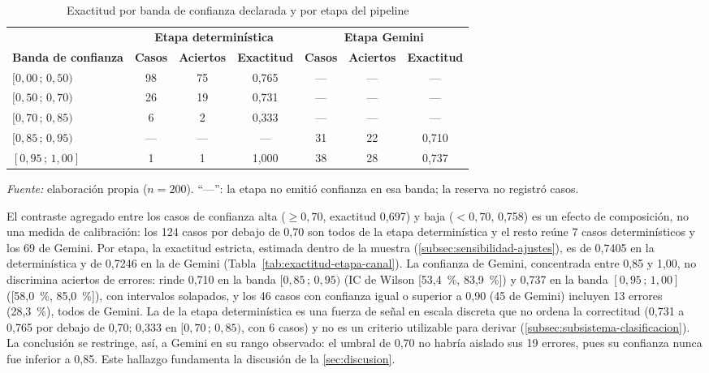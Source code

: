 \begin{table}[htbp]
\centering
\caption{Exactitud por banda de confianza declarada y por etapa del pipeline}
\label{tab:bandas}
\footnotesize
\setlength{\tabcolsep}{4pt}
\begin{tabular}{@{}l c c c c c c@{}}
\toprule
 & \multicolumn{3}{c}{\textbf{Etapa determinística}} & \multicolumn{3}{c}{\textbf{Etapa Gemini}} \\
\cmidrule(lr){2-4}\cmidrule(lr){5-7}
\textbf{Banda de confianza} & \textbf{Casos} & \textbf{Aciertos} & \textbf{Exactitud} & \textbf{Casos} & \textbf{Aciertos} & \textbf{Exactitud} \\
\midrule
\([0{,}00\,;\,0{,}50)\) & 98 & 75 & 0,765 & --- & --- & --- \\
\([0{,}50\,;\,0{,}70)\) & 26 & 19 & 0,731 & --- & --- & --- \\
\([0{,}70\,;\,0{,}85)\) & 6  & 2  & 0,333 & --- & --- & --- \\
\([0{,}85\,;\,0{,}95)\) & --- & --- & --- & 31 & 22 & 0,710 \\
\([0{,}95\,;\,1{,}00]\) & 1 & 1 & 1,000 & 38 & 28 & 0,737 \\
\bottomrule
\end{tabular}
\par\smallskip
{\footnotesize\textit{Fuente:} elaboración propia (\(n = 200\)). ``---'': la etapa no emitió confianza en esa banda; la reserva no registró casos.\par}
\end{table}

El contraste agregado entre los casos de confianza alta (\(\ge 0{,}70\), exactitud 0,697) y baja (\(< 0{,}70\), 0,758) es un efecto de composición, no una medida de calibración: los 124 casos por debajo de 0,70 son todos de la etapa determinística y el resto reúne 7 casos determinísticos y los 69 de Gemini. Por etapa, la exactitud estricta, estimada dentro de la muestra (\autoref{subsec:sensibilidad-ajustes}), es de 0,7405 en la determinística y de 0,7246 en la de Gemini (Tabla~\ref{tab:exactitud-etapa-canal}). La confianza de Gemini, concentrada entre 0,85 y 1,00, no discrimina aciertos de errores: rinde 0,710 en la banda \([0{,}85\,;\,0{,}95)\) (IC de Wilson [53,4~\%, 83,9~\%]) y 0,737 en la banda \([0{,}95\,;\,1{,}00]\) ([58,0~\%, 85,0~\%]), con intervalos solapados, y los 46 casos con confianza igual o superior a 0,90 (45 de Gemini) incluyen 13 errores (28,3~\%), todos de Gemini. La de la etapa determinística es una fuerza de señal en escala discreta que no ordena la correctitud (0,731 a 0,765 por debajo de 0,70; 0,333 en \([0{,}70\,;\,0{,}85)\), con 6 casos) y no es un criterio utilizable para derivar (\autoref{subsec:subsistema-clasificacion}). La conclusión se restringe, así, a Gemini en su rango observado: el umbral de 0,70 no habría aislado sus 19 errores, pues su confianza nunca fue inferior a 0,85. Este hallazgo fundamenta la discusión de la \autoref{sec:discusion}.

